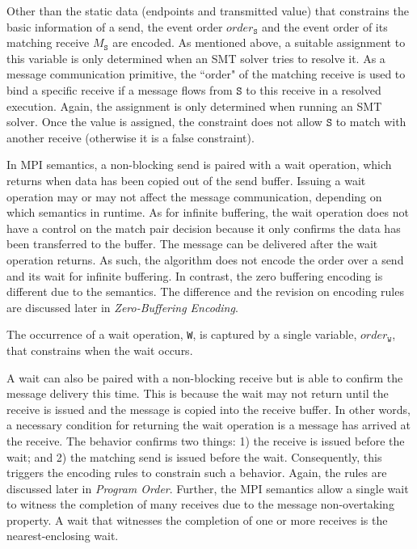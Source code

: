 Other than the static data (endpoints and transmitted value) that constrains the basic information of a send, the event order $\mathit{order}_\mathtt{S}$ and the event order of its matching receive $M_\mathtt{S}$ are encoded.  As mentioned above, a suitable assignment to this variable is only determined when an SMT solver tries to resolve it. As a message communication primitive, the ``order" of the matching receive is used to bind a specific receive if a message flows from $\mathtt{S}$ to this receive in a resolved execution. Again, the assignment is only determined when running an SMT solver. Once the value is assigned, the constraint does not allow $\mathtt{S}$ to match with another receive (otherwise it is a false constraint).

In MPI semantics, a non-blocking send is paired with a wait operation, which returns when data has been copied out of the send buffer. Issuing a wait operation may or may not affect the message communication, depending on which semantics in runtime. As for infinite buffering, the wait operation does not have a control on the match pair decision because it only confirms the data has been transferred to the buffer. The message can be delivered after the wait operation returns. As such, the algorithm does not encode the order over a send and its wait for infinite buffering. In contrast, the zero buffering encoding is different due to the semantics. The difference and the revision on encoding rules are discussed later in \textit{Zero-Buffering Encoding}. 
 
\begin{definition}[Wait] \label{def:wait}
The occurrence of a wait operation, \texttt{W}, is captured by a
single variable, $\mathit{order}_\mathtt{W}$, that constrains when
the wait occurs.
\end{definition}

A wait can also be paired with a non-blocking receive but is able to confirm the message delivery this time. This is because the wait may not return until the receive is issued and the message is copied into the receive buffer. In other words, a necessary condition for returning the wait operation is a message has arrived at the receive. The behavior confirms two things: 1) the receive is issued before the wait; and 2) the matching send is issued before the wait. Consequently, this triggers the encoding rules to constrain such a behavior. Again, the rules are discussed later in \textit{Program Order}.  Further, the MPI semantics allow a single wait to witness the completion of many receives due to the message non-overtaking property. A wait that witnesses the completion of one or more receives is the nearest-enclosing wait.

